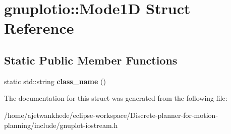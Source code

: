\hypertarget{structgnuplotio_1_1Mode1D}{}\section{gnuplotio\+:\+:Mode1D Struct Reference}
\label{structgnuplotio_1_1Mode1D}
\subsection*{Static Public Member Functions}
\begin{DoxyCompactItemize}
\item 
\mbox{\label{structgnuplotio_1_1Mode1D_a508d170d84da4dfb7cd07eebad894b8f}} 
static std\+::string {\bfseries class\+\_\+name} ()
\end{DoxyCompactItemize}


The documentation for this struct was generated from the following file\+:\begin{DoxyCompactItemize}
\item 
/home/ajetwankhede/eclipse-\/workspace/\+Discrete-\/planner-\/for-\/motion-\/planning/include/gnuplot-\/iostream.\+h\end{DoxyCompactItemize}
